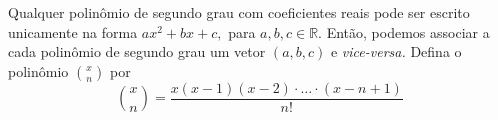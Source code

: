 \documentclass[11pt,a4paper]{article}
\begin{document}
\begin{exercicio}
Qualquer polinômio de segundo grau com coeficientes reais pode ser escrito unicamente na forma $ax^2 + bx + c,$ para $a,b,c \in \mathbb{R}.$ Então, podemos associar a cada polinômio de segundo grau um vetor $(a,b,c)$ e \emph{vice-versa.} Defina o polinômio $\binom{x}{n}$ por
\[
\binom{x}{n} = \frac{x(x-1)(x-2) \cdot \ldots \cdot (x - n + 1)}{n !}
\]
\end{exercicio}
\end{document}
